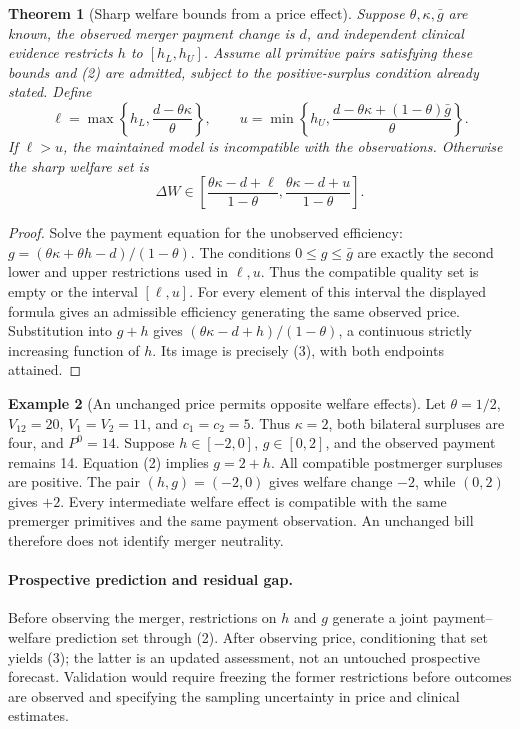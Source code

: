 \documentclass[11pt]{article}
\newtheorem{theorem}{Theorem}
\theoremstyle{definition}
\newtheorem{example}[theorem]{Example}
\begin{document}
\begin{theorem}[Sharp welfare bounds from a price effect]
Suppose $\theta,\kappa,\bar g$ are known, the observed merger payment change is $d$, and independent clinical evidence restricts $h$ to $[h_L,h_U]$. Assume all primitive pairs satisfying these bounds and (2) are admitted, subject to the positive-surplus condition already stated. Define
\[
 \ell=\max\left\{h_L,\frac{d-\theta\kappa}{\theta}\right\},
 \qquad
 u=\min\left\{h_U,
 \frac{d-\theta\kappa+(1-\theta)\bar g}{\theta}\right\}.
\]
If $\ell>u$, the maintained model is incompatible with the observations. Otherwise the sharp welfare set is
\[
 \Delta W\in\left[
 \frac{\theta\kappa-d+\ell}{1-\theta},
 \frac{\theta\kappa-d+u}{1-\theta}\right].
 \tag{3}
\]
\end{theorem}
\begin{proof}
Solve the payment equation for the unobserved efficiency:
$g=(\theta\kappa+\theta h-d)/(1-\theta)$. The conditions $0\leq g\leq\bar g$ are exactly the second lower and upper restrictions used in $\ell,u$. Thus the compatible quality set is empty or the interval $[\ell,u]$. For every element of this interval the displayed formula gives an admissible efficiency generating the same observed price. Substitution into $g+h$ gives $(\theta\kappa-d+h)/(1-\theta)$, a continuous strictly increasing function of $h$. Its image is precisely (3), with both endpoints attained.
\end{proof}

\begin{example}[An unchanged price permits opposite welfare effects]
Let $\theta=1/2$, $V_{12}=20$, $V_1=V_2=11$, and $c_1=c_2=5$. Thus $\kappa=2$, both bilateral surpluses are four, and $P^0=14$. Suppose $h\in[-2,0]$, $g\in[0,2]$, and the observed payment remains 14. Equation (2) implies $g=2+h$. All compatible postmerger surpluses are positive. The pair $(h,g)=(-2,0)$ gives welfare change $-2$, while $(0,2)$ gives $+2$. Every intermediate welfare effect is compatible with the same premerger primitives and the same payment observation. An unchanged bill therefore does not identify merger neutrality.
\end{example}

\paragraph{Prospective prediction and residual gap.}
Before observing the merger, restrictions on $h$ and $g$ generate a joint payment--welfare prediction set through (2). After observing price, conditioning that set yields (3); the latter is an updated assessment, not an untouched prospective forecast. Validation would require freezing the former restrictions before outcomes are observed and specifying the sampling uncertainty in price and clinical estimates.
\end{document}
